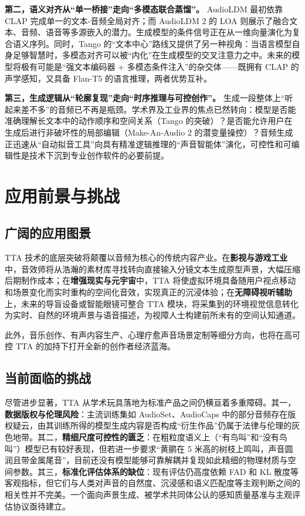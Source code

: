 \documentclass[12pt,a4paper]{article}
\begin{document}
\textbf{第二，语义对齐从“单一桥接”走向“多模态联合蒸馏”。} AudioLDM 最初依靠 CLAP 完成单一的文本-音频全局对齐；而 AudioLDM 2 的 LOA 则展示了融合文本、音频、语音等多源嵌入的潜力。生成模型的条件信号正在从一维向量演化为复合语义序列。同时，Tango 的“文本中心”路线又提供了另一种视角：当语言模型自身足够智慧时，多模态对齐可以被“内化”在生成模型的交叉注意力之中。未来的模型将极有可能是“强文本编码器 + 多模态条件注入”的杂交体——既拥有 CLAP 的声学感知，又具备 Flan-T5 的语言推理，两者优势互补。

\textbf{第三，生成逻辑从“轮廓复现”走向“时序推理与可控创作”。} 生成一段整体上“听起来差不多”的音频已不再是瓶颈。学术界及工业界的焦点已然转向：模型是否能准确理解长文本中的动作顺序和空间关系（Tango 的突破）？是否能允许用户在生成后进行非破坏性的局部编辑（Make-An-Audio 2 的潜变量操控）？音频生成正迅速从“自动拟音工具”向具有精准逻辑推理的“声音智能体”演化，可控性和可编辑性是技术下沉到专业创作软件的必要前提。

\section{应用前景与挑战}

\subsection{广阔的应用图景}
TTA 技术的底层突破将颠覆以音频为核心的传统内容产业。在\textbf{影视与游戏工业}中，音效师将从浩瀚的素材库寻找转向直接输入分镜文本生成原型声景，大幅压缩后期制作成本；在\textbf{增强现实与元宇宙}中，TTA 将使虚拟环境具备随用户视点移动和场景变化而实时重构的空间化音效，实现真正的沉浸体验；在\textbf{无障碍视听辅助}上，未来的导盲设备或智能眼镜可整合 TTA 模块，将采集到的环境视觉信息转化为实时、自然的环境声景与语音描述，为视障人士构建前所未有的空间认知通道。

此外，音乐创作、有声内容生产、心理疗愈声音场景定制等细分方向，也将在高可控 TTA 的加持下打开全新的创作者经济蓝海。

\subsection{当前面临的挑战}
尽管进步显著，TTA 从学术玩具落地为标准产品之间仍横亘着多重障碍。其一，\textbf{数据版权与伦理风险}：主流训练集如 AudioSet、AudioCaps 中的部分音频存在版权疑云，由其训练所得的模型生成内容是否构成“衍生作品”仍属于法律与伦理的灰色地带。其二，\textbf{精细尺度可控性的匮乏}：在粗粒度语义上（“有鸟叫”和“没有鸟叫”）模型已有较好表现，但若进一步要求“黄鹂在 5 米高的树枝上鸣叫，声音圆润且带金属尾音”，目前还没有模型能够可靠解耦并复现如此精细的物理材质与空间参数。其三，\textbf{标准化评估体系的缺位}：现有评估仍高度依赖 FAD 和 KL 散度等客观指标，但它们与人类对声音的自然度、沉浸感和语义匹配度等主观判断之间的相关性并不完美。一个面向声景生成、被学术共同体公认的感知质量基准与主观评估协议亟待建立。
\end{document}
